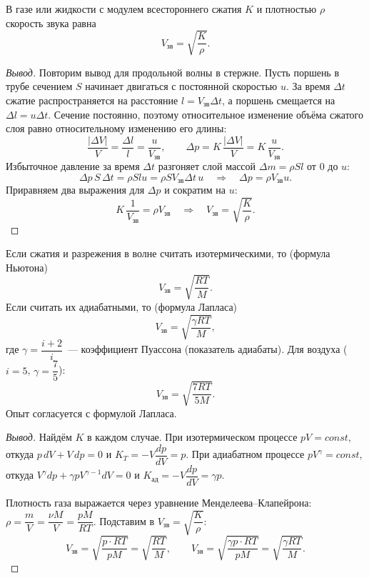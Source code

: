 \documentclass[12pt]{article}
\begin{document}
	\begin{statement}
		В газе или жидкости с модулем всестороннего сжатия $K$ и плотностью $\rho$ скорость звука равна
		\[
			V_{\text{зв}} = \sqrt{\dfrac{K}{\rho}}.
		\]
	\end{statement}
	\begin{proof}[Вывод]
		Повторим вывод для продольной волны в стержне. Пусть поршень в трубе сечением $S$ начинает двигаться с постоянной скоростью $u$. За время $\varDelta t$ сжатие распространяется на расстояние $l = V_{\text{зв}}\varDelta t$, а поршень смещается на $\varDelta l = u\varDelta t$. Сечение постоянно, поэтому относительное изменение объёма сжатого слоя равно относительному изменению его длины:
		\[
			\dfrac{|\varDelta V|}{V} = \dfrac{\varDelta l}{l} = \dfrac{u}{V_{\text{зв}}}, \qquad \varDelta p = K\,\dfrac{|\varDelta V|}{V} = K\,\dfrac{u}{V_{\text{зв}}}.
		\]
		Избыточное давление за время $\varDelta t$ разгоняет слой массой $\varDelta m = \rho S l$ от $0$ до $u$:
		\[
			\varDelta p\, S\,\varDelta t = \rho S l u = \rho S V_{\text{зв}}\varDelta t\, u \quad \Longrightarrow \quad \varDelta p = \rho V_{\text{зв}} u.
		\]
		Приравняем два выражения для $\varDelta p$ и сократим на $u$:
		\[
			K\,\dfrac{1}{V_{\text{зв}}} = \rho V_{\text{зв}} \quad \Longrightarrow \quad V_{\text{зв}} = \sqrt{\dfrac{K}{\rho}}.
		\]
	\end{proof}

	\begin{statement}
		Если сжатия и разрежения в волне считать изотермическими, то (формула Ньютона)
		\[
			V_{\text{зв}} = \sqrt{\dfrac{RT}{M}}.
		\]
		Если считать их адиабатными, то (формула Лапласа)
		\[
			V_{\text{зв}} = \sqrt{\dfrac{\gamma RT}{M}},
		\]
		где $\gamma = \dfrac{i + 2}{i}$~--- коэффициент Пуассона (показатель адиабаты). Для воздуха ($i = 5$, $\gamma = \dfrac{7}{5}$):
		\[
			V_{\text{зв}} = \sqrt{\dfrac{7RT}{5M}}.
		\]
		Опыт согласуется с формулой Лапласа.
	\end{statement}
	\begin{proof}[Вывод]
		Найдём $K$ в каждом случае. При изотермическом процессе $pV = const$, откуда $p\,dV + V\,dp = 0$ и $K_T = -V\dfrac{dp}{dV} = p$. При адиабатном процессе $pV^\gamma = const$, откуда $V^\gamma dp + \gamma p V^{\gamma - 1} dV = 0$ и $K_{\text{ад}} = -V\dfrac{dp}{dV} = \gamma p$.

		Плотность газа выражается через уравнение Менделеева--Клапейрона: $\rho = \dfrac{m}{V} = \dfrac{\nu M}{V} = \dfrac{pM}{RT}$. Подставим в $V_{\text{зв}} = \sqrt{\dfrac{K}{\rho}}$:
		\[
			V_{\text{зв}} = \sqrt{\dfrac{p \cdot RT}{pM}} = \sqrt{\dfrac{RT}{M}}, \qquad V_{\text{зв}} = \sqrt{\dfrac{\gamma p \cdot RT}{pM}} = \sqrt{\dfrac{\gamma RT}{M}}.
		\]
	\end{proof}
\end{document}
